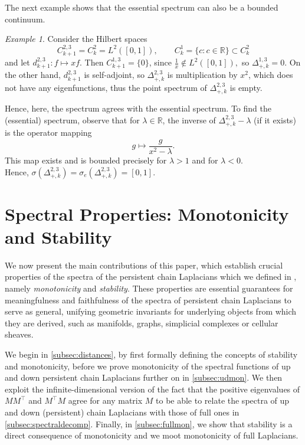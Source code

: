 \documentclass[11pt]{article}
\theoremstyle{definition}
\theoremstyle{remark}
\newtheorem{example}[theorem]{Example}
\newcommand{\R}{\mathbb{R}}
\begin{document}
The next example shows that the essential spectrum can also be a bounded continuum.

\begin{example} \label{ex:espec2}
    Consider the Hilbert spaces 
$$
        C_{k+1}^{2,3} =C_{k}^2=L^2([0,1]), \qquad
        C_{k}^1=\{c:c \in \R \} \subset C_{k}^2
$$
and let $d_{k+1}^{2,3}: f \mapsto xf.$ Then $C_{k+1}^{1,3}=\{0\}$, since $\frac{1}{x} \not \in L^2([0,1]),$ so $\Delta_{+,k}^{1,3}=0$. On the other hand, $d_{k+1}^{2,3}$ is self-adjoint, so $\Delta_{+,k}^{2,3}$ is multiplication by $x^2$, which does not have any eigenfunctions, thus the point spectrum of $\Delta_{+,k}^{2,3}$ is empty.
    
    Hence, here, the spectrum agrees with the essential spectrum. To find the (essential) spectrum, observe that for $\lambda \in \R$, the inverse of $\Delta_{+,k}^{2,3}-\lambda$ (if it exists) is the operator mapping 
    $$
    g \mapsto \frac g {x^2- \lambda}.
    $$
    This map exists and is bounded precisely for $\lambda >1$ and for $\lambda <0$.\\
    Hence, $\sigma(\Delta_{+,k}^{2,3})=\sigma_e(\Delta_{+,k}^{2,3})=[0,1]$.
\end{example}


\section{Spectral Properties: Monotonicity and Stability} \label{sec:stab}

We now present the main contributions of this paper, which establish crucial properties of the spectra of the persistent chain Laplacians which we defined in , namely \emph{monotonicity} and \emph{stability}. These properties are essential guarantees for meaningfulness and faithfulness of the spectra of persistent chain Laplacians to serve as general, unifying geometric invariants for underlying objects from which they are derived, such as manifolds, graphs, simplicial complexes or cellular sheaves.  

We begin in \cref{subsec:distances}, by first formally defining the concepts of stability and monotonicity, before we prove monotonicity of the spectral functions of up and down persistent chain Laplacians further on in \cref{subsec:udmon}. We then exploit the infinite-dimensional version of the fact that the positive eigenvalues of $MM^\top$ and $M^\top M$ agree for any matrix $M$ to be able to relate the spectra of up and down (persistent) chain Laplacians with those of full ones in \cref{subsec:spectraldecomp}. Finally, in \cref{subsec:fullmon}, we show that stability is a direct consequence of monotonicity and we moot monotonicity of full Laplacians.
\end{document}
